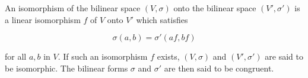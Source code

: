 An isomorphism of the bilinear space $(V, \sigma)$ onto the bilinear space $(V', \sigma')$ is a linear isomorphism $f$ of $V$ onto $V'$ which satisfies

$$\sigma(a, b) = \sigma'(af, bf)$$

for all $a, b$ in $V$. If such an isomorphism $f$ exists, $(V, \sigma)$ and $(V', \sigma')$ are said to be isomorphic. The bilinear forms $\sigma$ and $\sigma'$ are then said to be congruent.
